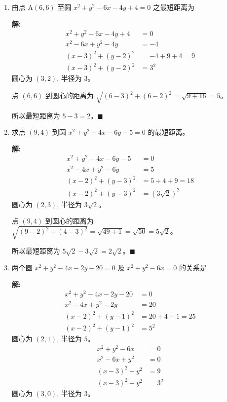 \documentclass[10pt]{article}
\newcommand{\sol}{\textbf{解:} }
\begin{document}
\begin{enumerate}[leftmargin=*]
  \item 由点 $\mathrm{A}(6,6)$ 至圆 $x^{2}+y^{2}-6 x-4 y+4=0$ 之最短距离为
  
  \sol{}
  \begin{align*}
    x^2 + y^2 - 6x - 4y + 4 &= 0\\
    x^2 - 6x + y^2 - 4y &= -4\\
    (x-3)^2 + (y-2)^2 &= -4 + 9 + 4 = 9\\
    (x-3)^2 + (y-2)^2 &= 3^2
  \end{align*}
  圆心为 $(3, 2)$, 半径为 $3$。

  点 $(6, 6)$ 到圆心的距离为 $\sqrt{(6-3)^{2}+(6-2)^{2}} = \sqrt{9+16} = 5$。

  所以最短距离为 $5-3 = 2$。\hfill$\blacksquare$
  
  \item 求点 $(9,4)$ 到圆 $x^{2}+y^{2}-4 x-6 y-5=0$ 的最短距离。
  
  \sol{}
  \begin{align*}
    x^2 + y^2 - 4x - 6y - 5 &= 0\\
    x^2 - 4x + y^2 - 6y &= 5\\
    (x-2)^2 + (y-3)^2 &= 5 + 4 + 9 = 18\\
    (x-2)^2 + (y-3)^2 &= (3\sqrt{2})^2
  \end{align*}
  圆心为 $(2, 3)$, 半径为 $3\sqrt{2}$。

  点 $(9, 4)$ 到圆心的距离为 $\sqrt{(9-2)^{2}+(4-3)^{2}} = \sqrt{49+1} = \sqrt{50} = 5\sqrt{2}$。

  所以最短距离为 $5\sqrt{2} - 3\sqrt{2} = 2\sqrt{2}$。\hfill$\blacksquare$

  \item 两个圆 $x^{2}+y^{2}-4 x-2 y-20=0$ 及 $x^{2}+y^{2}-6 x=0$ 的关系是
  
  \sol{}
  \begin{align*}
    x^2 + y^2 - 4x - 2y - 20 &= 0\\
    x^2 - 4x + y^2 - 2y &= 20\\
    (x-2)^2 + (y-1)^2 &= 20 + 4 + 1 = 25\\
    (x-2)^2 + (y-1)^2 &= 5^2
  \end{align*}
  圆心为 $(2, 1)$, 半径为 $5$。
  \begin{align*}
    x^2 + y^2 - 6x &= 0\\
    x^2 - 6x + y^2 &= 0\\
    (x-3)^2 + y^2 &= 9\\
    (x-3)^2 + y^2 &= 3^2
  \end{align*}
  圆心为 $(3, 0)$, 半径为 $3$。


\end{enumerate}
\end{document}

